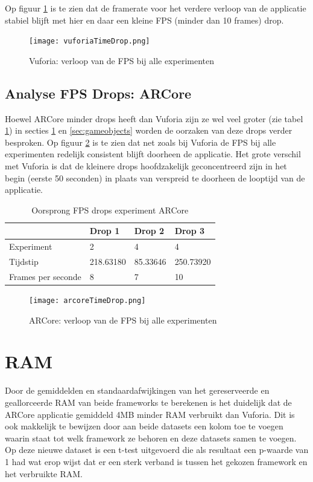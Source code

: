Op figuur \ref{fig:vuforiaTimeDrop} is te zien dat de framerate voor het verdere verloop van de applicatie stabiel blijft met hier en daar een kleine FPS (minder dan 10 frames) drop.

\begin{figure}
    \texttt{[image: vuforiaTimeDrop.png]}
    \caption{Vuforia: verloop van de FPS bij alle experimenten}
    \label{fig:vuforiaTimeDrop}
\end{figure}

\subsection{Analyse FPS Drops: ARCore}
Hoewel ARCore minder drops heeft dan Vuforia zijn ze wel veel groter (zie tabel \ref{tbl:arcoredrop}) in secties \ref{sec:memory} en \ref{sec:gameobjects} worden de oorzaken van deze drops verder besproken. Op figuur \ref{fig:arcoreTimeDrop} is te zien dat net zoals bij Vuforia de FPS bij alle experimenten redelijk consistent blijft doorheen de applicatie. Het grote verschil met Vuforia is dat de kleinere drops hoofdzakelijk geconcentreerd zijn in het begin (eerste 50 seconden) in plaats van verspreid te doorheen de looptijd van de applicatie. 

\begin{table}[]
    \begin{tabular}{@{}l|l|l|l@{}}
        & Drop 1    & Drop 2   & Drop 3    \\ \midrule
        Experiment         & 2         & 4        & 4         \\
        Tijdstip           & 218.63180 & 85.33646 & 250.73920 \\
        Frames per seconde & 8         & 7        & 10       
    \end{tabular}
    \caption{Oorsprong FPS drops experiment ARCore}\label{tbl:arcoredrop}
\end{table}

\begin{figure}
    \texttt{[image: arcoreTimeDrop.png]}
    \caption{ARCore: verloop van de FPS bij alle experimenten}
    \label{fig:arcoreTimeDrop}
\end{figure}

\section{RAM}\label{sec:memory}
Door de gemiddelden en standaardafwijkingen van het gereserveerde en geallorceerde RAM van beide frameworks te berekenen is het duidelijk dat de ARCore applicatie gemiddeld 4MB minder RAM verbruikt dan Vuforia. Dit is ook makkelijk te bewijzen door aan beide datasets een kolom toe te voegen waarin staat tot welk framework ze behoren en deze datasets samen te voegen. Op deze nieuwe dataset is een t-test uitgevoerd die als resultaat een p-waarde van 1 had wat erop wijst dat er een sterk verband is tussen het gekozen framework en het verbruikte RAM.

